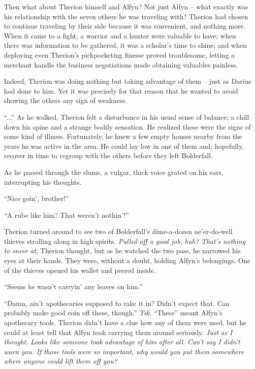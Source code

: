 Then what about Therion himself and Alfyn? Not just Alfyn -- what exactly was his relationship with the seven others he was traveling with? Therion had chosen to continue traveling by their side because it was convenient, and nothing more. When it came to a fight, a warrior and a hunter were valuable to have; when there was information to be gathered, it was a scholar's time to shine; and when deploying even Therion's pickpocketing finesse proved troublesome, letting a merchant handle the business negotiations made obtaining valuables painless. 

Indeed, Therion was doing nothing but taking advantage of them -- just as Darius had done to him. Yet it was precisely for that reason that he wanted to avoid showing the others any sign of weakness.

``...'' As he walked, Therion felt a disturbance in his usual sense of balance; a chill down his spine and a strange bodily sensation. He realized these were the signs of some kind of illness. Fortunately, he knew a few empty houses nearby from the years he was active in the area. He could lay low in one of them and, hopefully, recover in time to regroup with the others before they left Bolderfall.

As he passed through the slums, a vulgar, thick voice grated on his ears, interrupting his thoughts. 

``Nice goin', brother!''

``A rube like him? That weren't nothin'!'' 

Therion turned around to see two of Bolderfall's dime-a-dozen ne'er-do-well thieves strolling along in high spirits. \emph{Pulled off a good job, huh? That's nothing to sneer at}, Therion thought, but as he watched the two pass, he narrowed his eyes at their hands. They were, without a doubt, holding Alfyn's belongings. One of the thieves opened his wallet and peered inside.

``Seems he wasn't carryin' any leaves on him.''

``Damn, ain't apothecaries supposed to rake it in? Didn't expect that. Can probably make good coin off these, though.'' \emph{Tsk}. ``These'' meant Alfyn's apothecary tools. Therion didn't have a clue how any of them were used, but he could at least tell that Alfyn took carrying them around seriously. \emph{Just as I thought. Looks like someone took advantage of him after all. Can't say I didn't warn you. If those tools were so important, why would you put them somewhere where anyone could lift them off you?}

